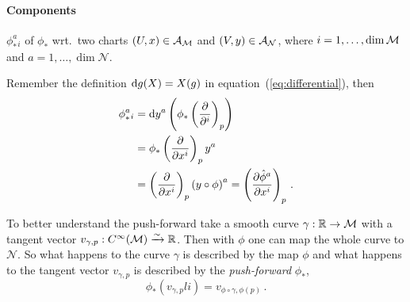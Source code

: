 \documentclass[11pt, a4paper, twocolumn]{article} %
\begin{document}
\paragraph{Components} $\phi_*^a{}_i$ of $\phi_*$ wrt.\ two charts
$(U,x)\in\mathcal{A}_{\mathcal{M}}$ and $(V,y)\in\mathcal{A}_{\mathcal{N}}$,
where $i=1,\ldots,\dim\mathcal{M}$ and $a=1,\ldots,\dim\mathcal{N}$.
\begin{center}
\end{center}
Remember the definition $\operatorname{d\!} g (X) = X(g)$ in equation~(\ref{eq:differential}),
then
\begin{align}
    \nonumber \phi_*^a{}_i &= \operatorname{d\!} y^a \left( \phi_* \left( \frac{\partial}{\partial^i} \right)_p \right)\\
    \label{eq:pushForwardComponents} &= \phi_*\left( \frac{\partial}{\partial x^i} \right)_p y^a\\
    \nonumber &= \left( \frac{\partial}{\partial x^i} \right)_p \left( y\circ\phi \right)^a
    = \left( \frac{\partial \hat{\phi}^a}{\partial x^i} \right)_p\,.
\end{align}
\begin{note}
    To better understand the push-forward take a smooth curve $\gamma: \mathbb{R} \to \mathcal{M}$ 
    with a tangent vector $v_{\gamma, p}: C^\infty(\mathcal{M}) \xrightarrow[]{\sim} \mathbb{R}$.
    Then with $\phi$ one can map the whole curve to $\mathcal{N}$.
    So what happens to the curve $\gamma$ is described by the map $\phi$ and what happens to
    the tangent vector $v_{\gamma, p}$ is  described by the \textit{push-forward}
    $\phi_*$,
    \begin{equation}
        \phi_*(v_{\gamma, p}li) = v_{\phi\circ\gamma, \phi(p)}\,.
    \end{equation}
    \begin{center}
    \end{center}
\end{note}
\end{document}
